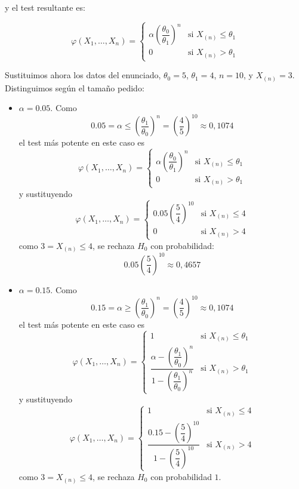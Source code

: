 \documentclass[12pt]{article}
\begin{document}
\begin{ejercicio}[1.75 puntos]
        y el test resultante es:

        $$\varphi(X_1, \ldots, X_n) = 
            \begin{cases}
                \alpha \left( \dfrac{\theta_0}{\theta_1} \right)^{n} &\text{si } X_{(n)} \leq \theta_1 \\
                0 &\text{si } X_{(n)} > \theta_1
            \end{cases}$$      

        Sustituimos ahora los datos del enunciado, $\theta_0 = 5$, $\theta_1 = 4$, $n=10$, y $X_{(n)} = 3$. Distinguimos según el tamaño pedido:
        \begin{itemize}
            \item $\alpha = 0.05$. Como 
            $$0.05 = \alpha \leq \left( \dfrac{\theta_1}{\theta_0} \right)^{n} = \left( \dfrac{4}{5} \right)^{10} \approx 0,1074$$
            el test más potente en este caso es
            $$\varphi(X_1, \ldots, X_n) = 
            \begin{cases}
                \alpha \left( \dfrac{\theta_0}{\theta_1} \right)^{n} &\text{si } X_{(n)} \leq \theta_1 \\
                0 &\text{si } X_{(n)} > \theta_1
            \end{cases}$$  
            y sustituyendo
            $$\varphi(X_1, \ldots, X_n) = 
            \begin{cases}
                0.05 \left( \dfrac{5}{4} \right)^{10} &\text{si } X_{(n)} \leq 4 \\
                0 &\text{si } X_{(n)} > 4
            \end{cases}$$  
            como $3 = X_{(n)} \leq 4$, se rechaza $H_0$ con probabilidad:
            $$0.05 \left( \dfrac{5}{4} \right)^{10} \approx 0,4657$$
            \item $\alpha = 0.15$. Como 
            $$0.15 = \alpha \geq \left( \dfrac{\theta_1}{\theta_0} \right)^{n} = \left( \dfrac{4}{5} \right)^{10} \approx 0,1074$$
            el test más potente en este caso es
            $$\varphi(X_1, \ldots, X_n) = 
            \begin{cases}
                1 &\text{si } X_{(n)} \leq \theta_1 \\
                \dfrac{\alpha - \left( \dfrac{\theta_1}{\theta_0} \right)^{n}}{1 - \left( \dfrac{\theta_1}{\theta_0} \right)^{n}} &\text{si } X_{(n)} > \theta_1
            \end{cases}$$    
            y sustituyendo
            $$\varphi(X_1, \ldots, X_n) = 
            \begin{cases}
                1 &\text{si } X_{(n)} \leq 4 \\
                \dfrac{0.15 - \left( \dfrac{5}{4} \right)^{10}}{1 - \left( \dfrac{5}{4} \right)^{10}} &\text{si } X_{(n)} > 4
            \end{cases}$$  
            como $3 = X_{(n)} \leq 4$, se rechaza $H_0$ con probabilidad $1$.
        \end{itemize}

    \end{ejercicio}
\end{document}
